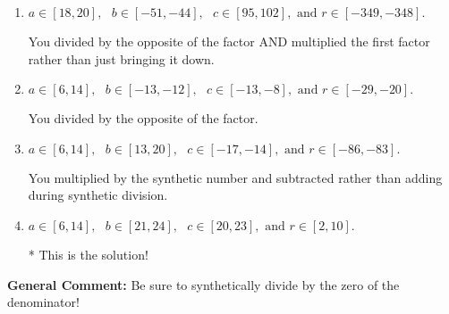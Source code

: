 \documentclass{extbook}[14pt]
\begin{document}
\begin{enumerate}
{\begin{enumerate}[label=\Alph*.]
 You multiplied by the synthetic number rather than bringing the first factor down.
\item \( a \in [18, 20], \text{   } b \in [-51, -44], \text{   } c \in [95, 102], \text{   and   } r \in [-349, -348]. \)

 You divided by the opposite of the factor AND multiplied the first factor rather than just bringing it down.
\item \( a \in [6, 14], \text{   } b \in [-13, -12], \text{   } c \in [-13, -8], \text{   and   } r \in [-29, -20]. \)

 You divided by the opposite of the factor.
\item \( a \in [6, 14], \text{   } b \in [13, 20], \text{   } c \in [-17, -14], \text{   and   } r \in [-86, -83]. \)

 You multiplied by the synthetic number and subtracted rather than adding during synthetic division.
\item \( a \in [6, 14], \text{   } b \in [21, 24], \text{   } c \in [20, 23], \text{   and   } r \in [2, 10]. \)

* This is the solution!
\end{enumerate}

\textbf{General Comment:} Be sure to synthetically divide by the zero of the denominator!
}
\end{enumerate}
\end{document}
